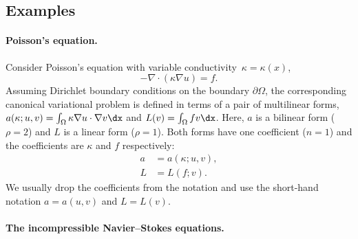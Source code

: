 \subsection{Examples}

\paragraph{Poisson's equation.}

Consider Poisson's equation with variable conductivity~$\kappa =
\kappa(x)$,
\begin{equation}
  -\nabla \cdot (\kappa \nabla u) = f.
\end{equation}
Assuming Dirichlet boundary conditions on the boundary
$\partial\Omega$, the corresponding canonical
variational problem is defined in terms of a pair of multilinear
forms, $a(\kappa; u, v) = \int_{\Omega} \kappa \nabla u \cdot \nabla
v \dx$ and $L(v) = \int_{\Omega} f v \dx$. Here, $a$ is a bilinear
form ($\rho = 2$) and $L$ is a linear form ($\rho = 1$). Both forms
have one coefficient ($n = 1$) and the coefficients are $\kappa$ and
$f$ respectively:
\begin{equation}
  \begin{split}
    a &= a(\kappa; u, v), \\
    L &= L(f; v).
  \end{split}
\end{equation}
We usually drop the coefficients from the notation and use the
short-hand notation $a = a(u, v)$ and $L = L(v)$.

\paragraph{The incompressible Navier--Stokes equations.}

